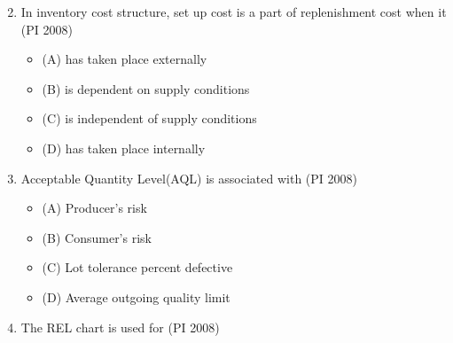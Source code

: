\documentclass[journal,12pt,onecolumn]{IEEEtran}
\theoremstyle{remark}
\begin{document}
\begin{enumerate}
\begin{multicols}{4}
\end{multicols}
\vspace{1cm}
\item[\textnormal{Q.4}]  In inventory cost structure, set up cost is a part of  replenishment cost when it
    \hfill{(PI 2008)}
    \begin{itemize}[label={}]
        \item (A) has taken place externally
        \item (B) is dependent on supply conditions
        \item (C) is independent of supply conditions
        \item (D) has taken place internally
    \end{itemize}
    \vspace{1cm}
    \item[\textnormal{Q.5}] Acceptable Quantity Level(AQL) is associated with
    \hfill{(PI 2008)}

\begin{itemize}[label={}]
        \item (A) Producer's risk
        \item (B) Consumer's risk
        \item (C) Lot tolerance percent defective
        \item (D) Average outgoing quality limit
    \end{itemize}
\vspace{1cm}
\item[\textnormal{Q.6}] The REL chart is used for 
    \hfill{(PI 2008)}


\end{enumerate}
\end{document}
